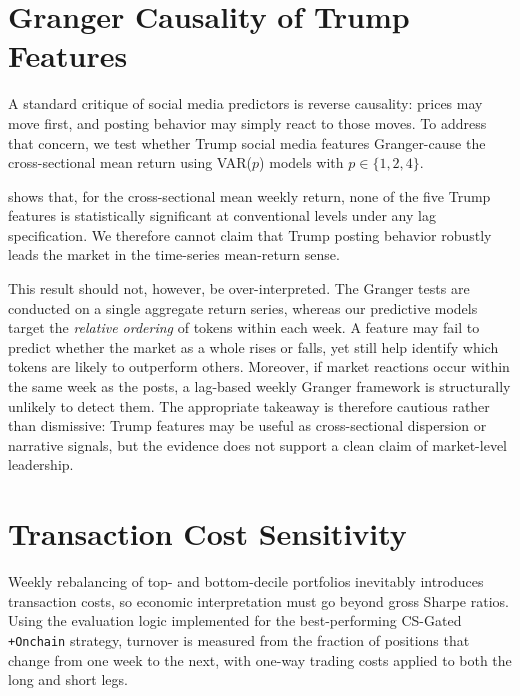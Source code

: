 \section{Granger Causality of Trump Features}
\label{sec:analysis:granger}

A standard critique of social media predictors is reverse causality:
prices may move first, and posting behavior may simply react to those moves.
To address that concern, we test whether Trump social media features
Granger-cause \citep{granger1969investigating} the cross-sectional mean
return using VAR($p$) models with $p \in \{1,2,4\}$.



 shows that, for the cross-sectional mean weekly return,
none of the five Trump features is statistically significant at conventional
levels under any lag specification.
We therefore cannot claim that Trump posting behavior robustly leads the
market in the time-series mean-return sense.

This result should not, however, be over-interpreted.
The Granger tests are conducted on a single aggregate return series,
whereas our predictive models target the \emph{relative ordering} of tokens
within each week.
A feature may fail to predict whether the market as a whole rises or falls,
yet still help identify which tokens are likely to outperform others.
Moreover, if market reactions occur within the same week as the posts, a
lag-based weekly Granger framework is structurally unlikely to detect them.
The appropriate takeaway is therefore cautious rather than dismissive:
Trump features may be useful as cross-sectional dispersion or narrative
signals, but the evidence does not support a clean claim of market-level
leadership.

\section{Transaction Cost Sensitivity}
\label{sec:analysis:txcost}

Weekly rebalancing of top- and bottom-decile portfolios inevitably introduces
transaction costs, so economic interpretation must go beyond gross Sharpe
ratios.
Using the evaluation logic implemented for the best-performing
CS-Gated \texttt{+Onchain} strategy, turnover is measured from the fraction of
positions that change from one week to the next, with one-way trading costs
applied to both the long and short legs.



